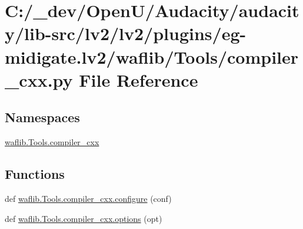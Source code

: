 \hypertarget{lv2_2plugins_2eg-midigate_8lv2_2waflib_2_tools_2compiler__cxx_8py}{}\section{C\+:/\+\_\+dev/\+Open\+U/\+Audacity/audacity/lib-\/src/lv2/lv2/plugins/eg-\/midigate.lv2/waflib/\+Tools/compiler\+\_\+cxx.py File Reference}
\label{lv2_2plugins_2eg-midigate_8lv2_2waflib_2_tools_2compiler__cxx_8py}
\subsection*{Namespaces}
\begin{DoxyCompactItemize}
\item 
 \hyperlink{namespacewaflib_1_1_tools_1_1compiler__cxx}{waflib.\+Tools.\+compiler\+\_\+cxx}
\end{DoxyCompactItemize}
\subsection*{Functions}
\begin{DoxyCompactItemize}
\item 
def \hyperlink{namespacewaflib_1_1_tools_1_1compiler__cxx_a0788b7c415a9fd34ea0f3f575fe60db3}{waflib.\+Tools.\+compiler\+\_\+cxx.\+configure} (conf)
\item 
def \hyperlink{namespacewaflib_1_1_tools_1_1compiler__cxx_a26997eea0edf25e3990533d4011a38e5}{waflib.\+Tools.\+compiler\+\_\+cxx.\+options} (opt)
\end{DoxyCompactItemize}
